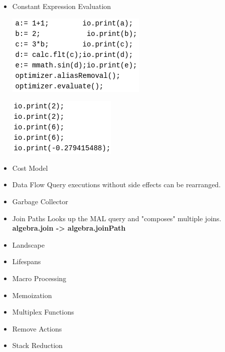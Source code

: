\documentclass[11pt]{article}
\begin{document}
\begin{itemize}
\item Constant Expression Evaluation

\begin{center}
\includegraphics[width=.9\linewidth]{./Pictures/const-exps-eval-1.png}
\end{center}              \begin{center}
\includegraphics[width=.9\linewidth]{./Pictures/const-exps-eval-1+.png}
\end{center}

\item Cost Model
\item Data Flow
Query executions without side effects can be rearranged.
\item Garbage Collector
\item Join Paths
Looks up the MAL query and "composes" multiple joins. \textbf{algebra.join -> algebra.joinPath}
\item Landscape
\item Lifespans
\item Macro Processing
\item Memoization
\item Multiplex Functions
\item Remove Actions
\item Stack Reduction
\end{itemize}
\end{document}
